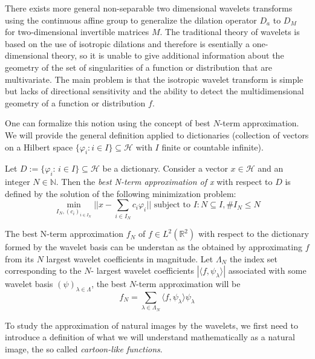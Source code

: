 \bigskip

There exists more general non-separable two dimensional wavelets transforms using the continuous affine group to generalize the dilation operator $D_a$ to $D_M$ for two-dimensional invertible matrices $M$. The traditional theory of wavelets is based on the use of isotropic dilations and therefore is esentially a one-dimensional theory, so it is unable to give additional information about the geometry of the set of singularities of a function or distribution that are multivariate. The main problem is that the isotropic wavelet transform is simple but lacks of directional sensitivity and the ability to detect the multidimensional geometry of a function or distribution $f$.

\bigskip

One can formalize this notion using the concept of best $N$-term approximation. We will provide the general definition applied to dictionaries (collection of vectors on a Hilbert space $\{\varphi_i: i\in I\}\subseteq \mathcal{H}$ with $I$ finite or countable infinite).

\bigskip

\begin{defn}
Let $D:=\{\varphi_i\text{:  }i\in I\}\subseteq \mathcal{H}$ be a dictionary. Consider a vector $x\in\mathcal{H}$ and an integer $N\in\mathbb{N}$. Then the \textit{best N-term approximation of x} with respect to $D$ is defined by the solution of the following minimization problem:
$$
\min_{I_N,(c_i)_{i\in I_N}}||x-\sum_{i\in I_N} c_i\varphi_i|| \text{ subject to } I:N\subseteq I,\# I_N\leq N
$$
\end{defn}

\bigskip

The best N-term approximation $f_N$ of $f\in L^2(\mathbb{R}^2)$ with respect to the dictionary formed by the wavelet basis can be understan as the obtained by approximating $f$ from its $N$ largest wavelet coefficients in magnitude. Let $\Lambda_N$ the index set corresponding to the $N$- largest wavelet coefficients $|\langle f,\psi_{\lambda}\rangle|$ associated with some wavelet basis $(\psi)_{\lambda\in\Lambda}$, the best $N$-term approximation will be
$$
f_N=\sum_{\lambda\in\Lambda_N}\langle f,\psi_{\lambda}\rangle\psi_{\lambda}
$$

\bigskip

To study the approximation of natural images by the wavelets, we first need to introduce a definition of what we will understand mathematically as a natural image, the so called \textit{cartoon-like functions}.

